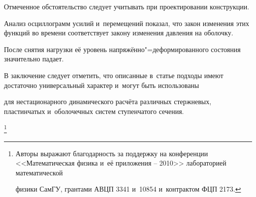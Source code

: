 Отмеченное обстоятельство следует учитывать при проектировании конструкции. 



Анализ осциллограмм усилий и~перемещений показал, что закон изменения этих функций во времени соответствует закону изменения давления на оболочку.

После снятия нагрузки её уровень напряжённо"=деформированного состояния значительно падает.



В заключение следует отметить, что описанные в~статье подходы имеют достаточно универсальный характер и~могут быть использованы

для нестационарного динамического расчёта различных стержневых, пластинчатых и~оболочечных систем ступенчатого сечения.





\thanks{Авторы выражают благодарность за поддержку на конференции <<Математическая физика и~её приложения -- 2010>>  лабораторией математической

физики СамГУ, грантами АВЦП 3341 и~10854 и~контрактом ФЦП 2173.}





